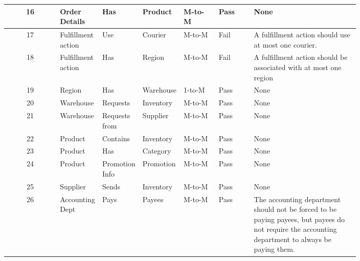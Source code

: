 \documentclass{article}
\begin{document}
\begin{longtable}{ | c | p{0.1\linewidth} | p{0.1\linewidth} | p{0.1\linewidth} | p{0.1\linewidth} | p{0.1\linewidth} | p{0.3\linewidth} | }
	16	& Order Details & Has & Product & M-to-M & Pass & None\\\hline
	17	& Fulfillment action & Use & Courier & M-to-M & Fail & A fulfillment action should use at most one courier.\\\hline
	18	& Fulfillment action & Has & Region & M-to-M & Fail & A fulfillment action should be associated with at most one region\\\hline
	19	& Region & Has & Warehouse & 1-to-M & Pass & None \\\hline
	20	& Warehouse & Requests & Inventory & M-to-M & Pass & None \\\hline
	21	& Warehouse & Requests from & Supplier & M-to-M & Pass & None \\\hline
	22	& Product & Contains & Inventory & M-to-M & Pass & None \\\hline
	23	& Product & Has & Category & M-to-M & Pass & None \\\hline
	24	& Product & Promotion Info & Promotion & M-to-M & Pass & None\\\hline
	25	& Supplier & Sends & Inventory & M-to-M & Pass & None \\\hline
	26	& Accounting Dept & Pays & Payees & M-to-M & Pass & The accounting department should not be forced to be paying payees, but payees do not require the accounting department to always be paying them.\\\hline
\end{longtable}
\end{document}
